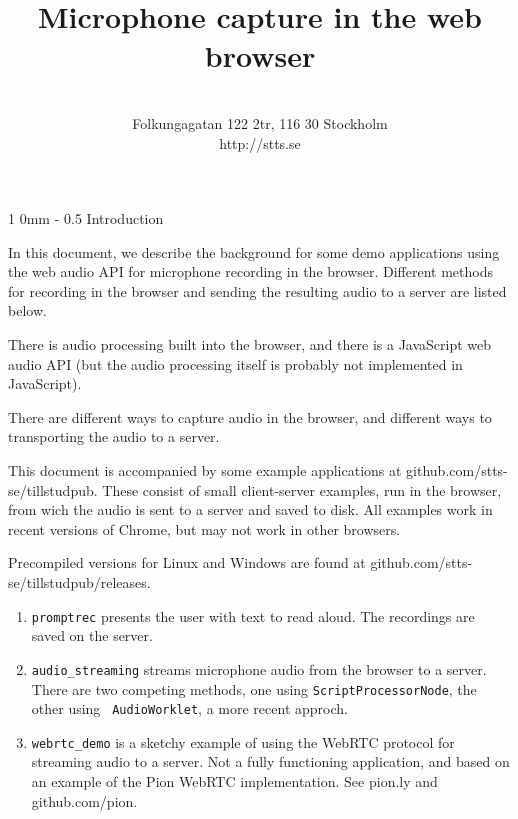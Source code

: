 \documentclass[11pt, a4paper, twoside]{article}
\title{ Microphone capture in the web browser }
\author{ \stts \\
  Folkungagatan 122 2tr, 116 30 Stockholm\\
  http://stts.se }
\makeatletter
\renewcommand{\section}{\@startsection
  {section}%
  {1}%
  {0mm}%
  {-\baselineskip}%
  {0.5\baselineskip}%
  {\bfseries\sffamily\Large}}%
\makeatother
\begin{document}
\maketitle
\cfoot{\thepage (\pageref{LastPage})}  


\section{Introduction}

In this document, we describe the background for some demo
applications using the web audio API for microphone recording in the
browser.  Different methods for recording in the browser and sending
the resulting audio to a server are listed below. 

There is audio processing built into the browser, and there is a
JavaScript web audio API (but the audio processing itself is probably not
implemented in JavaScript).

There are different ways to capture audio in the browser, and
different ways to transporting the audio to a server.

This document is accompanied by some example applications at
github.com/stts-se/tillstudpub. These consist of small client-server
examples, run in the browser, from wich the audio is sent to a server
and saved to disk. All examples work in recent versions of Chrome, but
may not work in other browsers.

Precompiled versions for Linux and Windows are
found at github.com/stts-se/tillstudpub/releases.


\begin{enumerate}
\item {\tt promptrec} presents the user with text to read aloud. The
  recordings are saved on the server.

\item {\tt audio\_streaming} streams microphone audio from the browser
  to a server. There are two competing methods, one
  using { \tt ScriptProcessorNode}, the other using {\tt
    AudioWorklet}, a more recent approch.

\item {\tt webrtc\_demo} is a sketchy example of using the WebRTC
  protocol for streaming audio to a server. Not a fully functioning
  application, and based on an example of the Pion WebRTC implementation.
  See pion.ly and github.com/pion.
  
\end{enumerate}
\end{document}
